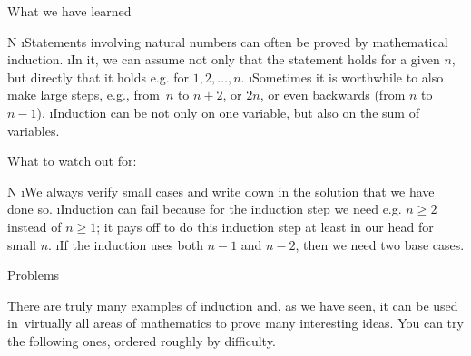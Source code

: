 \sec What we have learned

\begitems \style N
\i Statements involving natural numbers can often be proved by mathematical induction.
\i In it, we can assume not only that the statement holds for a given $n$, but directly that it holds e.g. for $1,2,\dots,n$. 
\i Sometimes it is worthwhile to also make large steps, e.g., from~$n$ to $n+2$, or $2n$, or even backwards (from $n$ to $n-1$).
\i Induction can be not only on one variable, but also on the sum of variables.
\enditems

What to watch out for:

\begitems \style N
\i We always verify small cases and write down in the solution that we have done so.
\i Induction can fail because for the induction step we need e.g. $n \ge 2$ instead of $n \ge 1$; it pays off to do this induction step at least in our head for small $n$.
\i If the induction uses both $n-1$ and $n-2$, then we need two base cases.
\enditems

\sec Problems

There are truly many examples of induction and, as we have seen, it can be used in~virtually all areas of mathematics to prove many interesting ideas. You can try the following ones, ordered roughly by difficulty.


